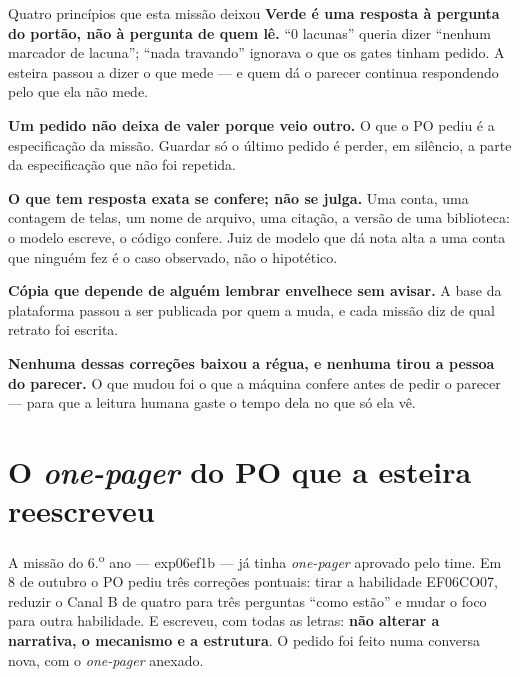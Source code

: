 \documentclass[11pt,a4paper]{article}
\newcommand{\cod}[1]{{\ttfamily\small #1}}
\begin{document}
\begin{caixaConceito}{Quatro princípios que esta missão deixou}
\textbf{Verde é uma resposta à pergunta do portão, não à pergunta de quem lê.} ``0 lacunas'' queria dizer ``nenhum marcador de lacuna''; ``nada travando'' ignorava o que os gates tinham pedido. A esteira passou a dizer o que mede --- e quem dá o parecer continua respondendo pelo que ela não mede.

\textbf{Um pedido não deixa de valer porque veio outro.} O que o PO pediu é a especificação da missão. Guardar só o último pedido é perder, em silêncio, a parte da especificação que não foi repetida.

\textbf{O que tem resposta exata se confere; não se julga.} Uma conta, uma contagem de telas, um nome de arquivo, uma citação, a versão de uma biblioteca: o modelo escreve, o código confere. Juiz de modelo que dá nota alta a uma conta que ninguém fez é o caso observado, não o hipotético.

\textbf{Cópia que depende de alguém lembrar envelhece sem avisar.} A base da plataforma passou a ser publicada por quem a muda, e cada missão diz de qual retrato foi escrita.
\end{caixaConceito}

\begin{destaque}
\textbf{Nenhuma dessas correções baixou a régua, e nenhuma tirou a pessoa do parecer.} O que mudou foi o que a máquina confere antes de pedir o parecer --- para que a leitura humana gaste o tempo dela no que só ela vê.
\end{destaque}

\section{O \emph{one-pager} do PO que a esteira reescreveu}
\label{sec:exp06}

A missão do 6.\textsuperscript{o} ano --- \cod{exp06ef1b} --- já tinha \emph{one-pager} aprovado pelo time. Em 8 de outubro o PO pediu três correções pontuais: tirar a habilidade EF06CO07, reduzir o Canal B de quatro para três perguntas ``como estão'' e mudar o foco para outra habilidade. E escreveu, com todas as letras: \textbf{não alterar a narrativa, o mecanismo e a estrutura}. O pedido foi feito numa conversa nova, com o \emph{one-pager} anexado.
\end{document}
